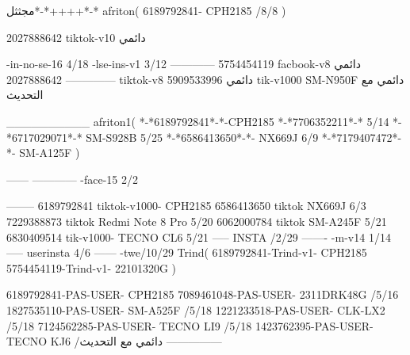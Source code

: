 مجثثل*-*++++*-*
afriton(
6189792841- CPH2185  /8/8
)

2027888642 tiktok-v10
دائمي

-in-no-se-16 4/18
-lse-ins-v1 3/12
------------
5754454119 facbook-v8
دائمي
--------------
2027888642 tiktok-v8
دائمي
5909533996 tik-v1000  SM-N950F
دائمي مع التحديث

__________
afriton1(
*-*6189792841*-*-CPH2185
*-*7706352211*-* 5/14
*-*6717029071*-*  SM-S928B 5/25
*-*6586413650*-*- NX669J  6/9
*-*7179407472*-*-  SM-A125F \5
)


------
------------
-face-15 2/2

--------
6189792841 tiktok-v1000- CPH2185 
6586413650 tiktok NX669J  6/3
7229388873 tiktok Redmi Note 8 Pro   5/20
6062000784 tiktok SM-A245F   5/21
6830409514 tik-v1000- TECNO CL6  5/21
-----
 INSTA /2/29
-------
-m-v14 1/14
-----
userinsta 4/6
------
-twe/10/29
Trind(
6189792841-Trind-v1- CPH2185 
5754454119-Trind-v1- 22101320G \5
)

6189792841-PAS-USER- CPH2185 
7089461048-PAS-USER- 2311DRK48G  /5/16
1827535110-PAS-USER- SM-A525F  /5/18
1221233518-PAS-USER-  CLK-LX2  /5/18
7124562285-PAS-USER-  TECNO LI9  /5/18
1423762395-PAS-USER- TECNO KJ6  /دائمي مع التحديث
    ---------------
